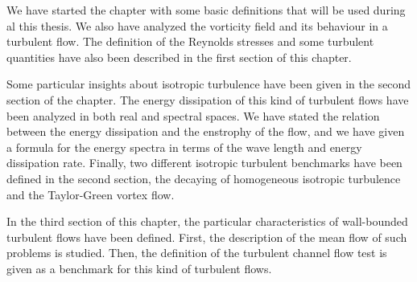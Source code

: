 We have started the chapter with some basic definitions that will be used during al this thesis. We also have analyzed the vorticity field and its behaviour in a turbulent flow. The definition of the Reynolds stresses and some turbulent quantities have also been described in the first section of this chapter.

Some particular insights about isotropic turbulence have been given in the second section of the chapter. The energy dissipation of this kind of turbulent flows have been analyzed in both real and spectral spaces. We have stated the relation between the energy dissipation and the enstrophy of the flow, and we have given a formula for the energy spectra in terms of the wave length and energy dissipation rate. Finally, two different isotropic turbulent benchmarks have been defined in the second section, the decaying of homogeneous isotropic turbulence and the Taylor-Green vortex flow.

In the third section of this chapter, the particular characteristics of wall-bounded turbulent flows have been defined. First, the description of the mean flow of such problems is studied. Then, the definition of the turbulent channel flow test is given as a benchmark for this kind of turbulent flows.
